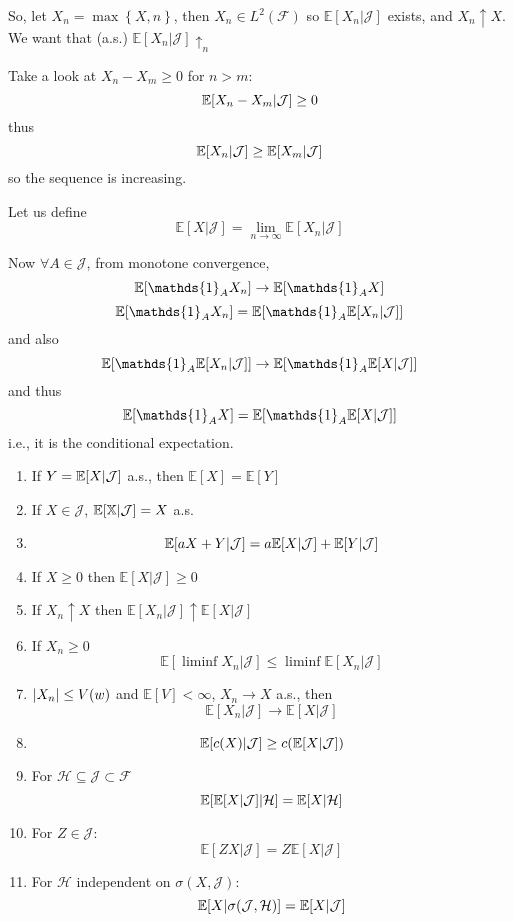 So, let $X_n=\max\left\{X, n\right\}$, then $X_n \in L^2(\mathcal{F})$ so $\mathbb{E}[X_n | \mathcal{J}]$ exists, and $X_n \uparrow X$. We want that (a.s.) $\mathbb{E}[X_n | \mathcal{J}] \uparrow_n $

Take a look at $X_n-X_m\geq 0$ for $n>m$:
$$\mathbb{E}\qty[X_n-X_m| \mathcal{J}] \geq 0$$
thus
$$\mathbb{E}\qty[X_n| \mathcal{J}] \geq \mathbb{E}\qty[X_m| \mathcal{J}]$$
so the sequence is increasing.

Let us define
$$\mathbb{E}[X | \mathcal{J}] = \lim_{n\to \infty} \mathbb{E}[X_n | \mathcal{J}]$$

Now $\forall A \in \mathcal{J}$, from monotone convergence,
$$\mathbb{E}\qty[\mathds{1}_AX_n] \to \mathbb{E}\qty[\mathds{1}_AX]$$
$$\mathbb{E}\qty[\mathds{1}_AX_n] = \mathbb{E}\qty[\mathds{1}_A\mathbb{E} \qty[X_n | \mathcal{J}]]$$
and also
$$\mathbb{E}\qty[\mathds{1}_A\mathbb{E} \qty[X_n | \mathcal{J}]] \to \mathbb{E}\qty[\mathds{1}_A\mathbb{E} \qty[X | \mathcal{J}]]$$
and thus
$$\mathbb{E}\qty[\mathds{1}_AX] = \mathbb{E}\qty[\mathds{1}_A\mathbb{E} \qty[X | \mathcal{J}]]$$
i.e., it is the conditional expectation.

\begin{prop}
	
	\begin{enumerate}
		\item If $Y = \mathbb{E}\qty[X| \mathcal{J}]$ a.s., then $\mathbb{E}[X] = \mathbb{E}[Y]$
		\item If $X\in \mathcal{J}$, $\mathbb{E}\qty[\mathbb{X|\mathcal{J}} ]= X$ a.s.
		\item $$\mathbb{E} \qty[aX+Y|\mathcal{J}] = a \mathbb{E} \qty[X|\mathcal{J}]+ \mathbb{E} \qty[Y|\mathcal{J}]$$
		\item If $X\geq 0$  then $ \mathbb{E}[X| \mathcal{J}] \geq 0$
		\item If $X_n\uparrow X $  then $ \mathbb{E}[X_n| \mathcal{J}] \uparrow \mathbb{E}[X| \mathcal{J}]$
		\item If $X_n \geq 0$ 
		$$ \mathbb{E}[\liminf X_n| \mathcal{J}]  \leq \liminf \mathbb{E}[X_n| \mathcal{J}] $$
		\item $\abs{X_n} \leq V(w)$ and $\mathbb{E}[V] < \infty $, $X_n \to X$ a.s., then 
		$$ \mathbb{E}[X_n| \mathcal{J}] \to \mathbb{E}[X| \mathcal{J}]$$
		\item 
		$$\mathbb{E} \qty[c(X) | \mathcal{J}] \geq c(\mathbb{E} \qty[X | \mathcal{J}])$$
		\item For $\mathcal{H} \subseteq \mathcal{J} \subset\mathcal{F}$
			$$\mathbb{E} \qty[\mathbb{E}[X| \mathcal{J}] | \mathcal{H}] = \mathbb{E}[X| \mathcal{H}]$$
		\item For $Z\in \mathcal{J}$:
		$$\mathbb{E}[ZX| \mathcal{J}]  =Z \mathbb{E}[X| \mathcal{J}] $$
		\item For $\mathcal{H}$ independent on $\sigma(X, \mathcal{J})$:
		$$\mathbb{E}[X| \sigma\qty(\mathcal{J}, \mathcal{H})] = \mathbb{E}[X| \mathcal{J}]$$
	\end{enumerate}
\end{prop}